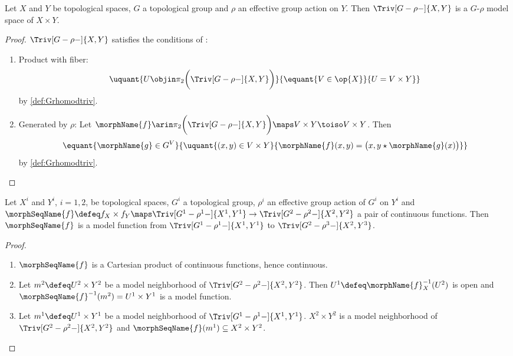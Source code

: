 \documentclass{article}
\begin{document}
\begin{lemma}
\label{lem:Grhomodtriv}
Let $X$ and $Y$ be topological spaces, $G$ a topological group and
$\rho$ an effective group action on $Y$. Then $\Triv[G-\rho-]{X,Y}$ is
a $G$-$\rho$ model space of $X \times Y$.

\begin{proof}
$\Triv[G-\rho-]{X,Y}$ satisfies the conditions of
:
\begin{enumerate}
\item Product with fiber:
\[
\uquant
  {
    U \objin \pi_2 \biggl ( \Triv[G-\rho-]{X,Y} \biggr )
  }
  {
    \equant
      {
        V \in \op{X}
      }
      {
        U = V \times Y
      }
  }
\]
by \cref{def:Grhomodtriv}.
\item Generated by $\rho$:
Let
$
  \morphName{f} \arin
  \pi_2 \biggl ( \Triv[G-\rho-]{X,Y} \biggr )
  \maps V \times Y \toiso V \times Y
$.
Then
\[
  \equant
    {
      \morphName{g} \in G^V
    }
    {
    \uquant
      {
        {(x,y) \in V \times Y}
      }
      {
        \morphName{f}(x,y) =
          \bigl ( x, y \star \morphName{g}(x) \bigr )
      }
    }
\]
by \cref{def:Grhomodtriv}.
\end{enumerate}
\end{proof}
\end{lemma}

\begin{lemma}
\label{lem:Grhomodtrivmorph}
Let $X^i$ and $Y^i$, $i=1,2$, be topological spaces, $G^i$ a topological
group, $\rho^i$ an effective group action of $G^i$ on $Y^i$ and
$
  \morphSeqName{f} \defeq f_X \times f_Y \maps
  \Triv[G^1-\rho^1-]{X^1,Y^1} \to \Triv[G^2-\rho^2-]{X^2,Y^2}
$
a pair of continuous functions. Then $\morphSeqName{f}$ is a model
function from $\Triv[G^1-\rho^1-]{X^1,Y^1}$ to
$\Triv[G^2-\rho^3-]{X^2,Y^3}$.
\begin{proof}
\leavevmode
\begin{enumerate}
\item
$\morphSeqName{f}$ is a Cartesian product of continuous functions, hence
continuous.

\item
Let $m^2 \defeq U^2 \times Y^2$ be a model neighborhood of
$\Triv[G^2-\rho^2-]{X^2,Y^2}$. Then
$U^1 \defeq \morphName{f}_X^{-1}(U^2)$ is open and
$\morphSeqName{f}^{-1}(m^2) = U^1 \times Y^1$ is a model function.

\item
Let $m^1 \defeq U^1 \times Y^1$ be a model neighborhood of
$\Triv[G^1-\rho^1-]{X^1,Y^1}$. $X^2 \times Y^2$ is a model neighborhood
of $\Triv[G^2-\rho^2-]{X^2,Y^2}$ and
$\morphSeqName{f}(m^1) \subseteq X^2 \times Y^2$.
\end{enumerate}
\end{proof}
\end{lemma}
\end{document}
